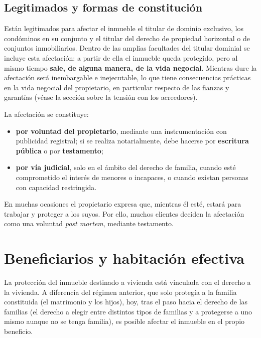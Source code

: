 \documentclass[12pt,oneside]{book}
\begin{document}
\subsection{Legitimados y formas de constitución}

Están legitimados para afectar el inmueble el titular de dominio exclusivo, los condóminos en su conjunto y el titular del derecho de propiedad horizontal o de conjuntos inmobiliarios. Dentro de las amplias facultades del titular dominial se incluye esta afectación: a partir de ella el inmueble queda protegido, pero al mismo tiempo \textbf{sale, de alguna manera, de la vida negocial}. Mientras dure la afectación será inembargable e inejecutable, lo que tiene consecuencias prácticas en la vida negocial del propietario, en particular respecto de las fianzas y garantías (véase la sección sobre la tensión con los acreedores).

La afectación se constituye:
\begin{itemize}
    \item \textbf{por voluntad del propietario}, mediante una instrumentación con publicidad registral; si se realiza notarialmente, debe hacerse por \textbf{escritura pública} o por \textbf{testamento};
    \item \textbf{por vía judicial}, solo en el ámbito del derecho de familia, cuando esté comprometido el interés de menores o incapaces, o cuando existan personas con capacidad restringida.
\end{itemize}

\begin{note}
En muchas ocasiones el propietario expresa que, mientras él esté, estará para trabajar y proteger a los suyos. Por ello, muchos clientes deciden la afectación como una voluntad \textit{post mortem}, mediante testamento.
\end{note}

\section{Beneficiarios y habitación efectiva}

La protección del inmueble destinado a vivienda está vinculada con el derecho a la vivienda. A diferencia del régimen anterior, que solo protegía a la familia constituida (el matrimonio y los hijos), hoy, tras el paso hacia el derecho de las familias (el derecho a elegir entre distintos tipos de familias y a protegerse a uno mismo aunque no se tenga familia), es posible afectar el inmueble en el propio beneficio.
\end{document}
